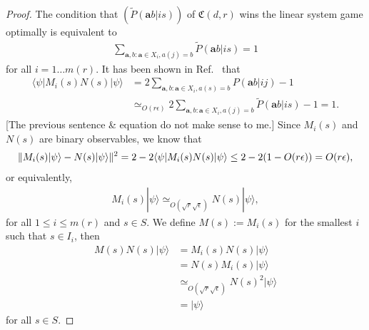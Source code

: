 \documentclass[11pt,letterpaper]{article}
\newcommand{\ket}[1]{|#1\rangle}
\newcommand{\bra}[1]{\langle#1|}
\DeclarePairedDelimiter{\norm}{\lVert}{\rVert}
\newcommand{\1}{\mathbb{1}}
\newcommand{\mr}{m(r)}
\newcommand{\fC}{\mathfrak{C}}
\newcommand{\ba}{\pmb{a}}
\newcommand{\pr}[2]{P(#1|#2)}
\newcommand{\tpr}[2]{\tilde{P}(#1|#2)}
\newcommand{\ep}{\epsilon}
\newcommand{\se}{\sqrt{\epsilon}}
\newcommand{\sr}{\sqrt{r}}
\newcommand{\appd}[1]{\simeq_{#1}}
\def\carl#1{{\color{blue} #1}}
\theoremstyle{definition}
\begin{document}
\begin{proof}
The condition that $(\tpr{\ba b}{i s})$ of $\fC(d,r)$ wins the linear system game optimally is equivalent to
\begin{align*}
\sum_{\ba,b: \ba \in X_i, a(j) = b} \tpr{\ba b}{is} = 1
\end{align*}
for all $i = 1 \dots \mr$.
It has been shown in Ref.~\cite{slofstra2017} that 
\begin{align*}
	\bra{\psi} M_i(s) N(s) \ket{\psi} &= 2 \sum_{\ba,b: \ba \in X_i, a(s) = b} \pr{\ba b}{ij} -1 \\
	&\appd{O(r \ep)} 2\sum_{\ba,b: \ba \in X_i, a(j) = b} \tpr{\ba b}{is} - 1 = 1.
\end{align*}
\carl{[The previous sentence \& equation do not make sense to me.]}
Since $M_i(s)$ and $N(s)$ are binary observables, we know that
\begin{align*}
    \norm{M_i(s)\ket{\psi} - N(s)\ket{\psi}}^2 
    = 2 - 2 \bra{\psi}M_i(s)N(s) \ket{\psi} 
    \leq 2 - 2(1 - O(r\ep)) = O(r\ep),
\end{align*}
or equivalently,
\begin{align*}
	M_{i}(s) \ket{\psi} \appd{O(\sr\se)} N(s) \ket{\psi},
\end{align*}
for all $1 \leq i \leq \mr$ and $s \in S$.
We define $M(s) := M_{i}(s)$ for the smallest $i$ such that $ s \in I_i$, then 
\begin{align*}
	M(s) N(s) \ket{\psi} & = M_{i}(s)N(s)\ket{\psi} \\
	    & = N(s) M_{i}(s) \ket{\psi} \\
	    &\appd{O(\sr\se)} N(s)^2 \ket{\psi} \\
	    &= \ket{\psi}
\end{align*}
for all $s \in S$.


\end{proof}
\end{document}
